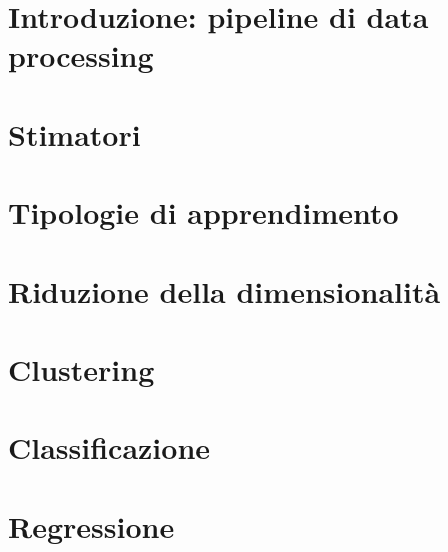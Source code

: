 \documentclass[italian, disablemarginnotes, allowcoloredmath]{../../../Resources/Utils/ClassNotes}
\begin{document}

\section{Introduzione: pipeline di data processing}


\section{Stimatori}


\section{Tipologie di apprendimento}


\section{Riduzione della dimensionalità}


\section{Clustering}


\section{Classificazione}


\section{Regressione}

\end{document}
